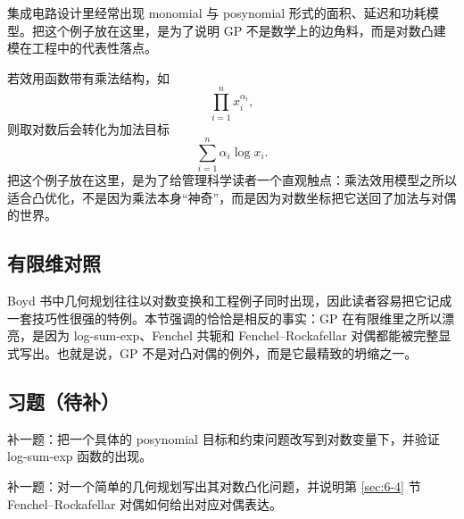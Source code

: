 \begin{example}[电路与面积功率折中]
集成电路设计里经常出现 monomial 与 posynomial 形式的面积、延迟和功耗模型。把这个例子放在这里，是为了说明 GP 不是数学上的边角料，而是对数凸建模在工程中的代表性落点。
\end{example}

\begin{example}[乘法效用资源分配]
若效用函数带有乘法结构，如
\[
\prod_{i=1}^n x_i^{\alpha_i},
\]
则取对数后会转化为加法目标
\[
\sum_{i=1}^n \alpha_i \log x_i.
\]
把这个例子放在这里，是为了给管理科学读者一个直观触点：乘法效用模型之所以适合凸优化，不是因为乘法本身“神奇”，而是因为对数坐标把它送回了加法与对偶的世界。
\end{example}

\subsection*{有限维对照}

Boyd 书中几何规划往往以对数变换和工程例子同时出现，因此读者容易把它记成一套技巧性很强的特例。本节强调的恰恰是相反的事实：GP 在有限维里之所以漂亮，是因为 log-sum-exp、Fenchel 共轭和 Fenchel--Rockafellar 对偶都能被完整显式写出。也就是说，GP 不是对凸对偶的例外，而是它最精致的坍缩之一。

\subsection*{习题（待补）}

\begin{exercise}[GP 对数变换占位]
补一题：把一个具体的 posynomial 目标和约束问题改写到对数变量下，并验证 log-sum-exp 函数的出现。
\end{exercise}

\begin{exercise}[GP 对偶桥接题占位]
补一题：对一个简单的几何规划写出其对数凸化问题，并说明第 \ref{sec:6-4} 节 Fenchel--Rockafellar 对偶如何给出对应对偶表达。
\end{exercise}
